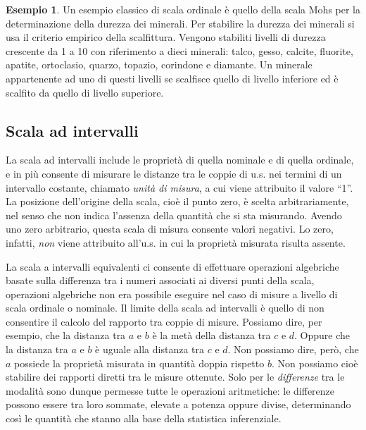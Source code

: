 \documentclass[
]{memoir}
\theoremstyle{definition}
\theoremstyle{definition}
\newtheorem{example}{Esempio}[chapter]
\theoremstyle{definition}
\theoremstyle{definition}
\theoremstyle{remark}
\begin{document}
\begin{example}
Un esempio classico di scala ordinale è quello della scala Mohs per la
determinazione della durezza dei minerali. Per stabilire la durezza dei
minerali si usa il criterio empirico della scalfittura. Vengono
stabiliti livelli di durezza crescente da 1 a 10 con riferimento a dieci
minerali: talco, gesso, calcite, fluorite, apatite, ortoclasio, quarzo,
topazio, corindone e diamante. Un minerale appartenente ad uno di questi
livelli se scalfisce quello di livello inferiore ed è scalfito da quello
di livello superiore.
\end{example}

\hypertarget{scala-ad-intervalli}{%
\subsection{Scala ad intervalli}\label{scala-ad-intervalli}}

La scala ad intervalli include le proprietà di quella nominale e di
quella ordinale, e in più consente di misurare le distanze tra le coppie
di u.s. nei termini di un intervallo costante, chiamato \emph{unità di
misura}, a cui viene attribuito il valore ``1''. La posizione dell'origine
della scala, cioè il punto zero, è scelta arbitrariamente, nel senso che
non indica l'assenza della quantità che si sta misurando. Avendo uno
zero arbitrario, questa scala di misura consente valori negativi. Lo
zero, infatti, \emph{non} viene attribuito all'u.s. in cui la proprietà
misurata risulta assente.

La scala a intervalli equivalenti ci consente di effettuare operazioni
algebriche basate sulla differenza tra i numeri associati ai diversi
punti della scala, operazioni algebriche non era possibile eseguire nel
caso di misure a livello di scala ordinale o nominale. Il limite della
scala ad intervalli è quello di non consentire il calcolo del rapporto
tra coppie di misure. Possiamo dire, per esempio, che la distanza tra
\(a\) e \(b\) è la metà della distanza tra \(c\) e \(d\). Oppure che la distanza
tra \(a\) e \(b\) è uguale alla distanza tra \(c\) e \(d\). Non possiamo dire,
però, che \(a\) possiede la proprietà misurata in quantità doppia rispetto
\(b\). Non possiamo cioè stabilire dei rapporti diretti tra le misure
ottenute. Solo per le \emph{differenze} tra le modalità sono dunque permesse
tutte le operazioni aritmetiche: le differenze possono essere tra loro
sommate, elevate a potenza oppure divise, determinando così le quantità
che stanno alla base della statistica inferenziale.
\end{document}
